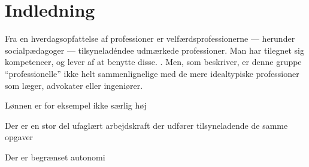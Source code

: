 \section{Indledning}

Fra en hverdagsopfattelse af professioner er velfærdsprofessionerne — herunder socialpædagoger — tilsyneladéndee udmærkede professioner. Man har tilegnet sig kompetencer, og lever af at benytte disse. \autocite[ss. 443-444]{frederiksenVelfaerdsprofessionerMellemOmsorg2017}.
Men, som \citeauthor{frederiksenVelfaerdsprofessionerMellemOmsorg2017} beskriver, er denne gruppe “professionelle” ikke helt sammenlignelige med de mere idealtypiske professioner som læger, advokater eller ingeniører.

Lønnen er for eksempel ikke særlig høj

Der er en stor del ufaglært arbejdskraft der udfører tilsyneladende de samme opgaver 

Der er begrænset autonomi


